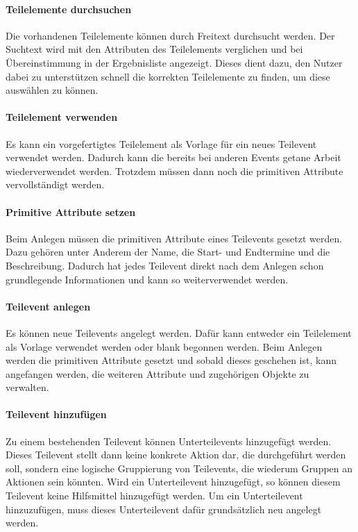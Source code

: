 \paragraph{Teilelemente durchsuchen}
Die vorhandenen Teilelemente können durch Freitext durchsucht werden. Der Suchtext wird mit den Attributen des Teilelements verglichen und bei Übereinstimmung in der Ergebnisliste angezeigt. Dieses dient dazu, den Nutzer dabei zu unterstützen schnell die korrekten Teilelemente zu finden, um diese auswählen zu können.

\paragraph{Teilelement verwenden}
Es kann ein vorgefertigtes Teilelement als Vorlage für ein neues Teilevent verwendet werden. Dadurch kann die bereits bei anderen Events getane Arbeit wiederverwendet werden. Trotzdem müssen dann noch die primitiven Attribute vervollständigt werden.

\paragraph{Primitive Attribute setzen}
Beim Anlegen müssen die primitiven Attribute eines Teilevents gesetzt werden. Dazu gehören unter Anderem der Name, die Start- und Endtermine und die Beschreibung. Dadurch hat jedes Teilevent direkt nach dem Anlegen schon grundlegende Informationen und kann so weiterverwendet werden.

\paragraph{Teilevent anlegen}
Es können neue Teilevents angelegt werden. Dafür kann entweder ein Teilelement als Vorlage verwendet werden oder blank begonnen werden. Beim Anlegen werden die primitiven Attribute gesetzt und sobald dieses geschehen ist, kann angefangen werden, die weiteren Attribute und zugehörigen Objekte zu verwalten.

\paragraph{Teilevent hinzufügen}
Zu einem bestehenden Teilevent können Unterteilevents hinzugefügt werden. Dieses Teilevent stellt dann keine konkrete Aktion dar, die durchgeführt werden soll, sondern eine logische Gruppierung von Teilevents, die wiederum Gruppen an Aktionen sein könnten. Wird ein Unterteilevent hinzugefügt, so können diesem Teilevent keine Hilfsmittel hinzugefügt werden. Um ein Unterteilevent hinzuzufügen, muss dieses Unterteilevent dafür grundsätzlich neu angelegt werden.

